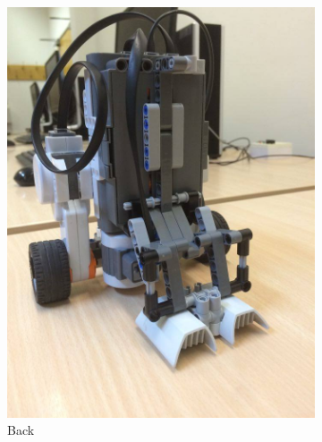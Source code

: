 \documentclass[12pt]{article}
\begin{document}
\begin{figure}[h!]
\begin{subfigure}[b]{0.3\textwidth}
		\includegraphics[width=\textwidth]{robot2}
		\caption{Back}
		\label{fig:back}
	\end{subfigure}
	~ 
	\begin{subfigure}[b]{0.3\textwidth}

\end{subfigure}
\end{figure}
\end{document}
